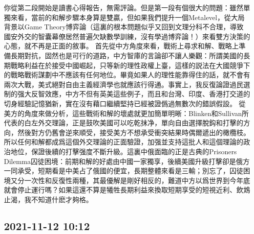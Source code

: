 \documentclass[twocolumn]{ctexart}
\begin{document}
你從第二段開始是讀書心得報告，無需評論。但是第一段有個很大的問題：雖然單獨來看，當前的和解步驟本身算是雙贏，但如果我們提升一個Metalevel，從大局背景以Game Theory博弈論（這裏的根本問題似乎又回到文理分科不合理，導致國安外交的智囊幕僚居然普遍欠缺數學訓練，沒有學過博弈論！）來看雙方決策的心態，就不再是正面的敘事。
首先從中方角度來看，戰術上尋求和解、戰略上準備長期對抗，固然也是可行的道路，中方智庫的言論卻不讓人樂觀：所謂美國的長期戰略利益在於接受中國崛起，只等新的理性政權上臺，這樣的説法在大國競爭下的戰略戰術謀劃中不應該有任何地位。畢竟如果人的理性能靠得住的話，就不會有兩次大戰，美式絕對自由主義經濟學也就應該行得通。事實上，我反復論證過民選制的强大反智效應，中方不但有英美這些例子，而且和台灣、印度、香港打交道的切身經驗記憶猶新，實在沒有藉口繼續堅持已經被證僞過無數次的錯誤假設。
從美方的角度來做分析，這些戰術和解的壞處就更加簡單明晰：Blinken和Sullivan所代表的白左外交理論，正是鼓吹美國可以吃乾抹净，單向自由選擇脫鈎和打擊的方向，然後對方仍舊會逆來順受，接受美方不想承受衝突結果時偶爾遞出的橄欖枝。所以任何和解都成爲這個外交理論的正面驗證，加强並支持這批人和這個理論的政治地位，保證後續的打擊强度不斷升級。這裏中俄面臨的正是古典的Prisoners Dilemma囚徒困境：前期和解的好處由中國一家獨享，後續美國升級打擊卻是俄方一同承受，短期看是中美占了俄國的便宜，長期整體來看是三輸；別忘了，囚徒困境又分一次性和反復性兩種，其最優解是剛好相反的，難道中方以爲世界到今年底就會停止運行嗎？如果這還不算是犧牲長期利益來換取短期享受的短視近利、飲鴆止渴，我不知道什麽才夠格。
\subsection*{2021-11-12 10:12}
\end{document}
